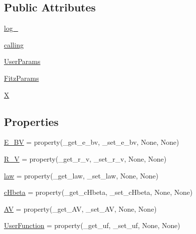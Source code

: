 \subsection*{Public Attributes}
\begin{DoxyCompactItemize}
\item 
\hyperlink{classpyneb_1_1extinction_1_1red__corr_1_1_red_corr_afd87151907f32bc0dc45f0171b61374e}{log\-\_\-}
\item 
\hyperlink{classpyneb_1_1extinction_1_1red__corr_1_1_red_corr_ab25fa7ebe84b603684dee62410c1e34c}{calling}
\item 
\hyperlink{classpyneb_1_1extinction_1_1red__corr_1_1_red_corr_a3b4156da5a457bf68c8b9d9c938edfa4}{User\-Params}
\item 
\hyperlink{classpyneb_1_1extinction_1_1red__corr_1_1_red_corr_a2db36f18d639dd5ae951cddd74bcc613}{Fitz\-Params}
\item 
\hyperlink{classpyneb_1_1extinction_1_1red__corr_1_1_red_corr_ac51b57a703ba1c5869228690c93e1701}{X}
\end{DoxyCompactItemize}
\subsection*{Properties}
\begin{DoxyCompactItemize}
\item 
\hyperlink{classpyneb_1_1extinction_1_1red__corr_1_1_red_corr_a97e4002139fdfd6739469528ea43b064}{E\-\_\-\-B\-V} = property(\-\_\-get\-\_\-e\-\_\-bv, \-\_\-set\-\_\-e\-\_\-bv, None, None)
\item 
\hyperlink{classpyneb_1_1extinction_1_1red__corr_1_1_red_corr_a9313bb1dc92bcd1947e92d79d23c19a7}{R\-\_\-\-V} = property(\-\_\-get\-\_\-r\-\_\-v, \-\_\-set\-\_\-r\-\_\-v, None, None)
\item 
\hyperlink{classpyneb_1_1extinction_1_1red__corr_1_1_red_corr_ab3fed296830f924db8afe5aeac4904ce}{law} = property(\-\_\-get\-\_\-law, \-\_\-set\-\_\-law, None, None)
\item 
\hyperlink{classpyneb_1_1extinction_1_1red__corr_1_1_red_corr_a50ca368c1b96db154e41c1534fa193cd}{c\-Hbeta} = property(\-\_\-get\-\_\-c\-Hbeta, \-\_\-set\-\_\-c\-Hbeta, None, None)
\item 
\hyperlink{classpyneb_1_1extinction_1_1red__corr_1_1_red_corr_a1b9a68c59df50a1a41c93512931c625d}{A\-V} = property(\-\_\-get\-\_\-\-A\-V, \-\_\-set\-\_\-\-A\-V, None, None)
\item 
\hyperlink{classpyneb_1_1extinction_1_1red__corr_1_1_red_corr_a0f4324192e2ead5408d8a1ab24be7e08}{User\-Function} = property(\-\_\-get\-\_\-uf, \-\_\-set\-\_\-uf, None, None)
\end{DoxyCompactItemize}


